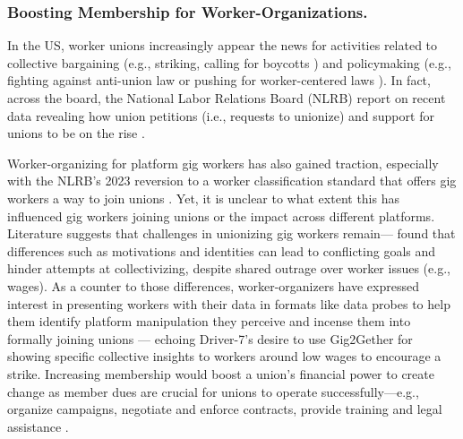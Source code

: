 {%


\subsubsection{Boosting Membership for Worker-Organizations.}
In the US, worker unions increasingly appear the news for activities related to collective bargaining (e.g., striking, calling for boycotts \cite{Yamat_2024, Robertson_2024, Reuters2024vw}) and policymaking (e.g., fighting against anti-union law or pushing for worker-centered laws \cite{Quinlan_2024a}). In fact, across the board, the National Labor Relations Board (NLRB) report on recent data revealing how union petitions (i.e., requests to unionize) and support for unions to be on the rise \cite{NLRB_2024}.

Worker-organizing for platform gig workers has also gained traction, especially with the NLRB's 2023 reversion to a worker classification standard that offers gig workers a way to join unions \cite{Cockayne_2023}. Yet, it is unclear to what extent this has influenced gig workers joining unions or the impact across different platforms. Literature suggests that challenges in unionizing gig workers remain---\citet{schou2023divided} found that differences such as motivations and identities can lead to conflicting goals and hinder attempts at collectivizing, despite shared outrage over worker issues (e.g., wages). As a counter to those differences, worker-organizers have expressed interest in presenting workers with their data in formats like data probes to help them identify platform manipulation they perceive and incense them into formally joining unions \cite{zhang2024data} --- echoing Driver-7's desire to use Gig2Gether for showing specific collective insights to workers around low wages to encourage a strike. Increasing membership would boost a union's financial power to create change as member dues are crucial for unions to operate successfully---e.g., organize campaigns, negotiate and enforce contracts, provide training and legal assistance \cite{UnionCoded_2023}. 
}